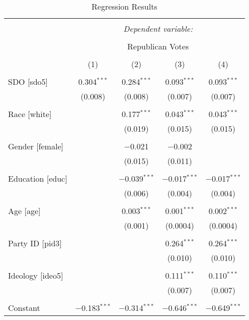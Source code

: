 
\begin{table}[!htbp] \centering 
  \caption{Regression Results} 
  \label{} 
\begin{tabular}{@{\extracolsep{5pt}}lcccc} 
\\[-1.8ex]\hline 
\hline \\[-1.8ex] 
 & \multicolumn{4}{c}{\textit{Dependent variable:}} \\ 
\cline{2-5} 
\\[-1.8ex] & \multicolumn{4}{c}{Republican Votes} \\ 
\\[-1.8ex] & (1) & (2) & (3) & (4)\\ 
\hline \\[-1.8ex] 
 SDO [sdo5] & 0.304$^{***}$ & 0.284$^{***}$ & 0.093$^{***}$ & 0.093$^{***}$ \\ 
  & (0.008) & (0.008) & (0.007) & (0.007) \\ 
  & & & & \\ 
 Race [white] &  & 0.177$^{***}$ & 0.043$^{***}$ & 0.043$^{***}$ \\ 
  &  & (0.019) & (0.015) & (0.015) \\ 
  & & & & \\ 
 Gender [female] &  & $-$0.021 & $-$0.002 &  \\ 
  &  & (0.015) & (0.011) &  \\ 
  & & & & \\ 
 Education [educ] &  & $-$0.039$^{***}$ & $-$0.017$^{***}$ & $-$0.017$^{***}$ \\ 
  &  & (0.006) & (0.004) & (0.004) \\ 
  & & & & \\ 
 Age [age] &  & 0.003$^{***}$ & 0.001$^{***}$ & 0.002$^{***}$ \\ 
  &  & (0.001) & (0.0004) & (0.0004) \\ 
  & & & & \\ 
 Party ID [pid3] &  &  & 0.264$^{***}$ & 0.264$^{***}$ \\ 
  &  &  & (0.010) & (0.010) \\ 
  & & & & \\ 
 Ideology [ideo5] &  &  & 0.111$^{***}$ & 0.110$^{***}$ \\ 
  &  &  & (0.007) & (0.007) \\ 
  & & & & \\ 
 Constant & $-$0.183$^{***}$ & $-$0.314$^{***}$ & $-$0.646$^{***}$ & $-$0.649$^{***}$ \\ 

\end{tabular}
\end{table}
